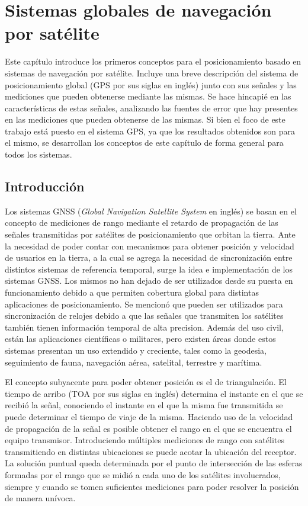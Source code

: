 \documentclass[a4paper,12pt,oneside,onecolumn,final,openright]{book}%
\begin{document}
\chapter{Sistemas globales de navegación por satélite}\label{ch:GNSS}
	Este capítulo introduce los primeros conceptos para el posicionamiento basado en sistemas de navegación por satélite. Incluye una breve descripción del sistema de posicionamiento global (GPS por sus siglas en inglés) junto con sus señales y las mediciones que pueden obtenerse mediante las mismas. Se hace hincapié en las características de estas señales, analizando las fuentes de error que hay presentes en las mediciones que pueden obtenerse de las mismas. Si bien el foco de este trabajo está puesto en el sistema GPS, ya que los resultados obtenidos son para el mismo, se desarrollan los conceptos de este capítulo de forma general para todos los sistemas. 
	
\section{Introducción}
	Los sistemas GNSS (\textit{Global Navigation Satellite System} en inglés) se basan en el concepto de mediciones de rango mediante el retardo de propagación de las señales transmitidas por satélites de posicionamiento que orbitan la tierra. Ante la necesidad de poder contar con mecanismos para obtener posición y velocidad de usuarios en la tierra, a la cual se agrega la necesidad de sincronización entre distintos sistemas de referencia temporal, surge la idea e implementación de los sistemas GNSS. Los mismos no han dejado de ser utilizados desde su puesta en funcionamiento debido a que permiten cobertura global para distintas aplicaciones de posicionamiento. Se mencionó que pueden ser utilizados para sincronización de relojes debido a que las señales que transmiten los satélites también tienen información temporal de alta precision. Además del uso civil, están las aplicaciones científicas o militares, pero existen áreas donde estos sistemas presentan un uso extendido y creciente, tales como la geodesia, seguimiento de fauna, navegación aérea, satelital, terrestre y marítima.
	
	El concepto subyacente para poder obtener posición es el de triangulación. El tiempo de arribo (TOA por sus siglas en inglés) determina el instante en el que se recibió la señal, conociendo el instante en el que la misma fue transmitida se puede determinar el tiempo de viaje de la misma. Haciendo uso de la velocidad de propagación de la señal es posible obtener el rango en el que se encuentra el equipo transmisor. Introduciendo múltiples mediciones de rango con satélites transmitiendo en distintas ubicaciones se puede acotar la ubicación del receptor. La solución puntual queda determinada por el punto de intersección de las esferas formadas por el rango que se midió a cada uno de los satélites involucrados, siempre y cuando se tomen suficientes mediciones para poder resolver la posición de manera unívoca. 
	
\end{document}
